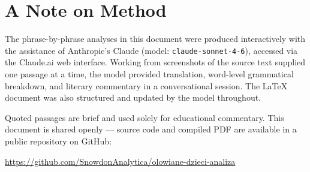 
\chapter*{A Note on Method}

The phrase-by-phrase analyses in this document were produced
interactively with the assistance of Anthropic's Claude (model:
\texttt{claude-sonnet-4-6}), accessed via the Claude.ai web interface.
Working from screenshots of the source text supplied one passage at a
time, the model provided translation, word-level grammatical breakdown,
and literary commentary in a conversational session. The \LaTeX{}
document was also structured and updated by the model throughout.

Quoted passages are brief and used solely for educational commentary.
This document is shared openly --- source code and compiled PDF are
available in a public repository on GitHub:

\begin{center}
\url{https://github.com/SnowdonAnalytica/olowiane-dzieci-analiza}
\end{center}
